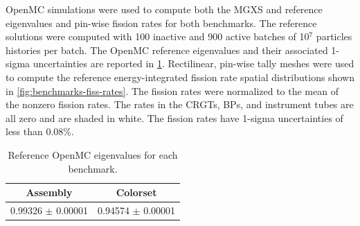 OpenMC simulations were used to compute both the MGXS and reference eigenvalues and pin-wise fission rates for both benchmarks. The reference solutions were computed with 100 inactive and 900 active batches of 10$^7$ particles histories per batch. The OpenMC reference eigenvalues and their associated 1-sigma uncertainties are reported in \cref{tab:keff-reference}. Rectilinear, pin-wise tally meshes were used to compute the reference energy-integrated fission rate spatial distributions shown in \cref{fig:benchmarks-fiss-rates}. The fission rates were normalized to the mean of the nonzero fission rates. The rates in the CRGTs, BPs, and instrument tubes are all zero and are shaded in white. The fission rates have 1-sigma uncertainties of less than 0.08\%.

\begin{table}[h!]
  \centering
  \caption{Reference OpenMC eigenvalues for each benchmark.}
  \label{tab:keff-reference}
  \begin{tabular}{c c}
  \toprule
  {\bf Assembly} &
  {\bf Colorset} \\
  \midrule
  0.99326 $\pm$ 0.00001 & 0.94574 $\pm$ 0.00001 \\
  \bottomrule
\end{tabular}
\end{table}


